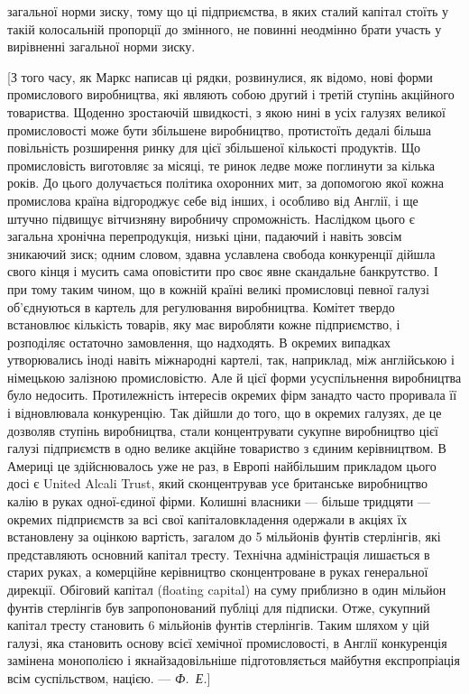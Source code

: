 \parcont{}  %
загальної норми зиску, тому що ці підприємства, в яких сталий
капітал стоїть у такій колосальній пропорції до змінного, не повинні неодмінно брати участь у
вирівненні загальної норми зиску.

[З того часу, як Маркс написав ці рядки, розвинулися, як
відомо, нові форми промислового виробництва, які являють
собою другий і третій ступінь акційного товариства. Щоденно
зростаючій швидкості, з якою нині в усіх галузях великої промисловості може бути збільшене
виробництво, протистоїть дедалі більша повільність розширення ринку для цієї збільшеної
кількості продуктів. Що промисловість виготовляє за місяці,
те ринок ледве може поглинути за кілька років. До цього долучається політика охоронних мит, за
допомогою якої кожна
промислова країна відгороджує себе від інших, і особливо від
Англії, і ще штучно підвищує вітчизняну виробничу спроможність.
Наслідком цього є загальна хронічна перепродукція, низькі ціни,
падаючий і навіть зовсім зникаючий зиск; одним словом, здавна
уславлена свобода конкуренції дійшла свого кінця і мусить
сама оповістити про своє явне скандальне банкрутство. І при
тому таким чином, що в кожній країні великі промисловці певної
галузі об’єднуються в картель для регулювання виробництва.
Комітет твердо встановлює кількість товарів, яку має виробляти кожне підприємство, і розподіляє
остаточно замовлення,
що надходять. В окремих випадках утворювались іноді навіть
міжнародні картелі, так, наприклад, між англійською і німецькою залізною промисловістю. Але й цієї
форми усуспільнення
виробництва було недосить. Протилежність інтересів окремих
фірм занадто часто проривала її і відновлювала конкуренцію. Так дійшли до того, що в окремих
галузях, де це
дозволяв ступінь виробництва, стали концентрувати сукупне
виробництво цієї галузі підприємств в одно велике акційне товариство з єдиним керівництвом. В
Америці це здійснювалось
уже не раз, в Европі найбільшим прикладом цього досі є United
Alcali Trust, який сконцентрував усе британське виробництво
калію в руках одної-єдиної фірми. Колишні власники —
більше тридцяти — окремих підприємств за всі свої капіталовкладення одержали в акціях їх встановлену
за оцінкою
вартість, загалом до 5 мільйонів фунтів стерлінгів, які представляють основний капітал тресту.
Технічна адміністрація лишається в старих руках, а комерційне керівництво сконцентроване в руках
генеральної дирекції. Обіговий капітал (floating
capital) на суму приблизно в один мільйон фунтів стерлінгів був
запропонований публіці для підписки. Отже, сукупний капітал
тресту становить 6 мільйонів фунтів стерлінгів. Таким шляхом
у цій галузі, яка становить основу всієї хемічної промисловості,
в Англії конкуренція замінена монополією і якнайзадовільніше
підготовляється майбутня експропріація всім суспільством,
нацією. — \emph{Ф.~Е.}]

